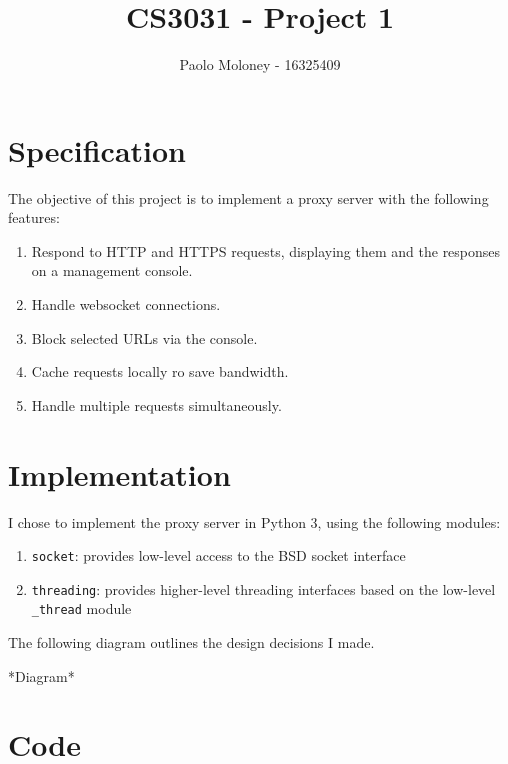 \documentclass{article}
\title{CS3031 - Project 1}
\author{Paolo Moloney - 16325409}
\begin{document}
\maketitle
\newpage

\tableofcontents
\newpage

\section{Specification}

The objective of this project is to implement a proxy server with the following features:

\begin{enumerate}
	\item Respond to HTTP and HTTPS requests, displaying them and the responses on a management console.
	\item Handle websocket connections.
	\item Block selected URLs via the console.
	\item Cache requests locally ro save bandwidth.
	\item Handle multiple requests simultaneously.
\end{enumerate}

\section{Implementation}

I chose to implement the proxy server in Python 3, using the following modules:

\begin{enumerate}
	\item \texttt{socket}: provides low-level access to the BSD socket interface
	\item \texttt{threading}: provides higher-level threading interfaces based on the low-level \texttt{\_thread} module
\end{enumerate}

The following diagram outlines the design decisions I made.

*Diagram*

\section{Code}
\end{document}
